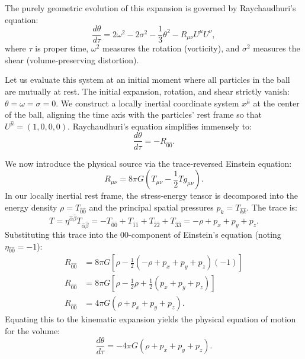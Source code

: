 \documentclass[11pt, a4paper]{report}
\begin{document}
The purely geometric evolution of this expansion is governed by Raychaudhuri's equation:
\begin{equation}
\label{eq:raychaudhuri}
\frac{d\theta}{d\tau} = 2\omega^{2} - 2\sigma^{2} - \frac{1}{3}\theta^{2} - R_{\mu\nu}U^{\mu}U^{\nu},
\end{equation}
where $\tau$ is proper time, $\omega^{2}$ measures the rotation (vorticity), and $\sigma^{2}$ measures the shear (volume-preserving distortion).

Let us evaluate this system at an initial moment where all particles in the ball are mutually at rest. The initial expansion, rotation, and shear strictly vanish: $\theta = \omega = \sigma = 0$. We construct a locally inertial coordinate system $x^{\hat{\mu}}$ at the center of the ball, aligning the time axis with the particles' rest frame so that $U^{\hat{\mu}} = (1, 0, 0, 0)$. Raychaudhuri's equation simplifies immensely to:
\begin{equation}
\frac{d\theta}{d\tau} = -R_{\hat{0}\hat{0}}.
\end{equation}

We now introduce the physical source via the trace-reversed Einstein equation:
\begin{equation}
R_{\mu\nu} = 8\pi G \left( T_{\mu\nu} - \frac{1}{2}T g_{\mu\nu} \right).
\end{equation}
In our locally inertial rest frame, the stress-energy tensor is decomposed into the energy density $\rho = T_{\hat{0}\hat{0}}$ and the principal spatial pressures $p_{k} = T_{\hat{k}\hat{k}}$. The trace is:
\begin{equation}
T = \eta^{\hat{\alpha}\hat{\beta}}T_{\hat{\alpha}\hat{\beta}} = -T_{\hat{0}\hat{0}} + T_{\hat{1}\hat{1}} + T_{\hat{2}\hat{2}} + T_{\hat{3}\hat{3}} = -\rho + p_{x} + p_{y} + p_{z}.
\end{equation}
Substituting this trace into the 00-component of Einstein's equation (noting $\eta_{\hat{0}\hat{0}} = -1$):
\begin{align}
R_{\hat{0}\hat{0}} &= 8\pi G \left[ \rho - \frac{1}{2}(-\rho + p_{x} + p_{y} + p_{z})(-1) \right] \nonumber \\
R_{\hat{0}\hat{0}} &= 8\pi G \left[ \rho - \frac{1}{2}\rho + \frac{1}{2}(p_{x} + p_{y} + p_{z}) \right] \nonumber \\
R_{\hat{0}\hat{0}} &= 4\pi G (\rho + p_{x} + p_{y} + p_{z}).
\end{align}
Equating this to the kinematic expansion yields the physical equation of motion for the volume:
\begin{equation}
\label{eq:expansion_gravity}
\frac{d\theta}{d\tau} = -4\pi G (\rho + p_{x} + p_{y} + p_{z}).
\end{equation}
\end{document}
